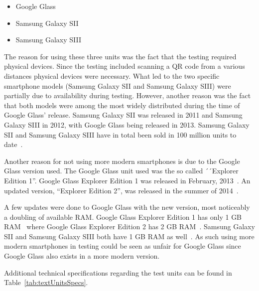 \begin{itemize}
	\item Google Glass
	\item Samsung Galaxy SII
	\item Samsung Galaxy SIII
\end{itemize}

The reason for using these three units was the fact that the testing required physical devices. Since the testing included scanning a QR code from a various distances physical devices were necessary. What led to the two specific smartphone models (Samsung Galaxy SII and Samsung Galaxy SIII) were partially due to availability during testing. However, another reason was the fact that both models were among the most widely distributed during the time of Google Glass' release. Samsung Galaxy SII was released in 2011 and Samsung Galaxy SIII in 2012, with Google Glass being released in 2013. Samsung Galaxy SII and Samsung Galaxy SIII have in total been sold in 100 million units to date~\cite{samsungGalaxyS2Sales, samsungGalaxyS3Sales}.

Another reason for not using more modern smartphones is due to the Google Glass version used. The Google Glass unit used was the so called ´´Explorer Edition 1''. Google Glass Explorer Edition 1 was released in February, 2013~\cite{historyOfGlass}. An updated version, ``Explorer Edition 2'', was released in the summer of 2014~\cite{googleGlassEdition2RAM}. 

A few updates were done to Google Glass with the new version, most noticeably a doubling of available RAM. Google Glass Explorer Edition 1 has only 1 GB RAM~\cite{googleGlassEdition1RAM} where Google Glass Explorer Edition 2 has 2 GB RAM~\cite{googleGlassEdition2RAM}. Samsung Galaxy SII and Samsung Galaxy SIII both have 1 GB RAM as well~\cite{samsungGalaxyS2Wiki, samsungGalaxyS3Wiki}. As such using more modern smartphones in testing could be seen as unfair for Google Glass since Google Glass also exists in a more modern version.

Additional technical specifications regarding the test units can be found in Table~\ref{tab:textUnitsSpecs}.

